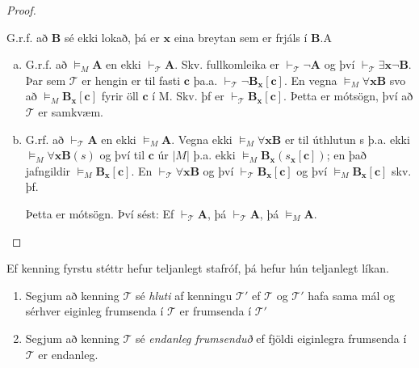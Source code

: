 \documentclass[12pt]{book}
\begin{document}
\begin{setn}
\begin{proof}
\begin{enumerate}[(1)]
      G.r.f. að $\mathbf{B}$ sé ekki lokað, þá er $\mathbf{x}$ eina breytan sem er frjáls í $\mathbf{B}$.A

      \begin{enumerate}[(a)]
      \item  G.r.f. að $\models_M \mathbf{A}$ en  ekki $\vdash_{\mathcal{T}} \mathbf{A}$.
        Skv. fullkomleika er $\vdash_{\mathcal{T}} \lnot \mathbf{A}$ og því
        $\vdash_{\mathcal{T}} \exists \mathbf{x} \lnot \mathbf{B}$. Þar sem
        $\mathcal{T}$ er hengin er til fasti $\mathbf{c}$ þa.a. 
        $\vdash_{\mathcal{T}} \lnot \mathbf{B}_{\mathbf{x}} [\mathbf{c}]$.
        En vegna $\models_M \forall \mathbf{x} \mathbf{B}$ svo að
        $\models_M \mathbf{B}_{\mathbf{x}} [\mathbf{c}]$ fyrir öll
        $\mathbf{c}$ í M.
        Skv. þf er $\vdash_{\mathcal{T}} \mathbf{B}_{\mathbf{x}} [\mathbf{c}]$. 
        Þetta er mótsögn, því að $\mathcal{T}$ er samkvæm.
      \item  G.rf. að $\vdash_{\mathcal{T}} \mathbf{A}$ en ekki $\models_M \mathbf{A}$.
        Vegna ekki $\models_M \forall \mathbf{x} \mathbf{B}$ er til úthlutun s
        þ.a. ekki $\models_M \forall \mathbf{x} \mathbf{B} (s)$ og því til $\mathbf{c}$ úr
        $|M|$ þ.a. ekki $\models_M \mathbf{B}_{\mathbf{x}} ( s_{\mathbf{x}}[\mathbf{c}])$;
        en það jafngildir $\models_M \mathbf{B}_{\mathbf{x}}[\mathbf{c}]$. En 
        $\vdash_{\mathcal{T}} \forall \mathbf{x} \mathbf{B}$ og því
        $\vdash_{\mathcal{T}} \mathbf{B}_{\mathbf{x}} [\mathbf{c}]$ og því
        $\models_M \mathbf{B}_{\mathbf{x}} [\mathbf{c}]$ skv. þf. 

        Þetta er mótsögn. Því sést:
        Ef $\vdash_{\mathcal{T}} \mathbf{A}$, þá $\vdash_{\mathcal{T}} \mathbf{A}$,
        þá $\models_M \mathbf{A}$.
      \end{enumerate}
    \end{enumerate}
    \end{proof}
\end{setn}

\begin{setn}
Ef kenning fyrstu stéttr hefur teljanlegt stafróf,
þá hefur hún teljanlegt líkan.
\end{setn}

\begin{skgr}
  \begin{enumerate}[(1)]
  \item  Segjum að kenning $\mathcal{T}$ sé \emph{hluti}
    af kenningu $\mathcal{T}'$ ef $\mathcal{T}$ og $\mathcal{T}'$ hafa
    sama mál og sérhver eiginleg frumsenda í $\mathcal{T}$ er frumsenda 
    í $\mathcal{T}'$
  \item Segjum að kenning $\mathcal{T}$ sé \emph{endanleg frumsenduð}
    ef fjöldi eiginlegra frumsenda í $\mathcal{T}$ er endanleg.
  \end{enumerate}
\end{skgr}
\end{document}
